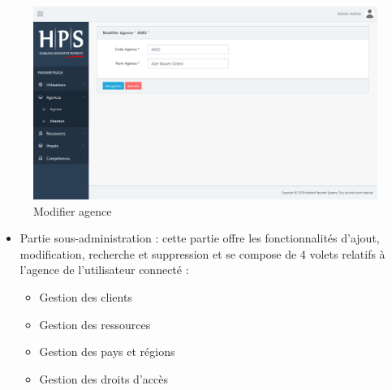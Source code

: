 \begin{itemize}[label=\textbullet]
\begin{itemize}
			\begin{figure}[h!]  
			\centering
			\includegraphics[width=1\textwidth]{chapitre5/Figures/modagence.png}
			\caption{Modifier agence}
			\end{figure}
			\end{itemize}

\begin{itemize}[label=\textbullet]
		\item Partie sous-administration : cette partie offre les fonctionnalités d’ajout, modification, recherche et suppression et se compose de 4 volets relatifs à l'agence de l'utilisateur connecté :
		\begin{itemize}
		\item Gestion des clients
      		\item Gestion des ressources
      		\item Gestion des pays et régions
      		\item Gestion des droits d'accès
		\end{itemize}
	\end{itemize}


\end{itemize}
